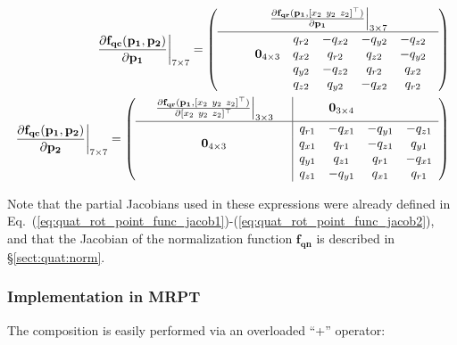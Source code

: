 \documentclass[a4paper,11pt]{report}
\begin{document}
\begin{eqnarray}
\label{eq:jacob_f_qc}
\left.
\frac{\partial \mathbf{f_{qc}}(\mathbf{p_1},\mathbf{p_2}) }{\partial \mathbf{p_1}}
\right|_{7 \times 7}
=
\left(
  \begin{array}{c}
     \left. \frac{\partial \mathbf{f_{qr}} (\mathbf{p_1}, [ x_2 ~ y_2 ~ z_2]^\top ) }{\partial \mathbf{p_1}} \right|_{3\times 7} \\ \hline
  \begin{array}{ccccccc}
    &  &  			& q_{r2} &-q_{x2} &-q_{y2} &-q_{z2}  \\
    & & \mathbf{0}_{4\times 3}  	& q_{x2} & q_{r2} & q_{z2} &-q_{y2}  \\
    & &  			& q_{y2} &-q_{z2} & q_{r2} & q_{x2}  \\
    & &  			& q_{z2} & q_{y2} &-q_{x2} & q_{r2}
  \end{array}
  \end{array}
\right)
\\
\left.
\frac{\partial \mathbf{f_{qc}}(\mathbf{p_1},\mathbf{p_2}) }{\partial \mathbf{p_2}}
\right|_{7 \times 7}
=
\left(
  \begin{array}{ccc|cccc}
     & \left.
	\frac{\partial \mathbf{f_{qr}} (\mathbf{p_1}, [ x_2 ~ y_2 ~ z_2]^\top ) }{\partial [ x_2 ~ y_2 ~ z_2]^\top} \right|_{3\times 3}
      &  & & \mathbf{0}_{3 \times 4}  \\ \hline
   & & 				& q_{r1} &-q_{x1} &-q_{y1} &-q_{z1}  \\
   & \mathbf{0}_{4\times 3} &	& q_{x1} & q_{r1} &-q_{z1} & q_{y1}  \\
   & & 				& q_{y1} & q_{z1} & q_{r1} &-q_{x1}  \\
   & & 				& q_{z1} &-q_{y1} & q_{x1} & q_{r1}
  \end{array}
\right)
\end{eqnarray}


Note that the partial Jacobians used in these expressions were already defined
in Eq.~(\ref{eq:quat_rot_point_func_jacob1})-(\ref{eq:quat_rot_point_func_jacob2}),
and that the Jacobian of the normalization function $\mathbf{f_{qn}}$ is described
in \S \ref{sect:quat:norm}.



\subsubsection{Implementation in MRPT}

The composition is easily performed via an overloaded ``+'' operator:
\end{document}
